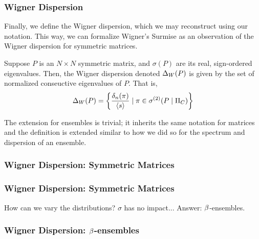 \begin{frame} \frametitle{Wigner Dispersion}

Finally, we define the Wigner dispersion, which we may reconstruct using our notation. This way, we can formalize Wigner's Surmise as
an observation of the Wigner dispersion for symmetric matrices.

\begin{alertblock}{}
Suppose $P$ is an $N \times N$ symmetric matrix, and $\sigma(P)$ are its real, sign-ordered eigenvalues.
Then, the Wigner dispersion denoted $\Delta_{W}(P)$ is given by the set of normalized conseuctive eigenvalues of $P$. That is,
$$ \Delta_{W}(P) = \left\{ \frac{\delta_n(\pi)}{{\langle s \rangle}} \mid \pi \in {\sigma^{(2)}}(P \mid \Pi_C) \right\} $$
\end{alertblock}

The extension for ensembles is trivial; it inherits the same notation for matrices and the definition is extended similar to how we
did so for the spectrum and dispersion of an ensemble.

\end{frame}


\begin{frame} \frametitle{Wigner Dispersion: Symmetric Matrices}


\end{frame}


\begin{frame} \frametitle{Wigner Dispersion: Symmetric Matrices}

How can we vary the distributions? $\sigma$ has no impact...
Answer: $\beta$-ensembles.

\end{frame}


\begin{frame} \frametitle{Wigner Dispersion: $\beta$-ensembles}


\end{frame}

